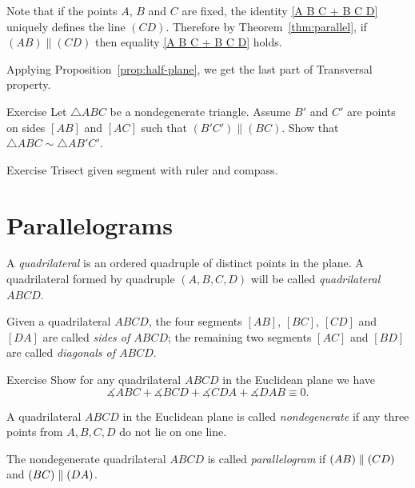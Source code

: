 Note that if the points $A$, $B$ and $C$ are fixed,
the identity \ref{A B C + B C D} uniquely defines the line $(C D)$.
Therefore by Theorem~\ref{thm:parallel}, if $(AB)\parallel(C D)$ then equality \ref{A B C + B C D} holds.

Applying Proposition~\ref{prop:half-plane},
we get the last part of Transversal property.
\qeds


\begin{thm}{Exercise}\label{ex:smililar+parallel}
Let $\triangle ABC$ be a nondegenerate triangle.
Assume $B'$ and $C'$ are points on sides $[AB]$ and $[AC]$ such that $(B'C')\parallel(BC)$.
Show that $\triangle ABC\sim\triangle AB'C'$.
\end{thm}

\begin{thm}{Exercise}\label{ex:trisection}
Trisect given segment with ruler and compass.
\end{thm}





\section*{Parallelograms}

A \emph{quadrilateral} is an ordered quadruple of distinct points in the plane.
A quadrilateral formed by quadruple $(A,B,C,D)$ will be called {}\emph{quadrilateral $ABCD$}.

Given a quadrilateral $ABCD$,
the four segments $[AB]$, $[BC]$, $[CD]$ and $[DA]$ are called \emph{sides of $ABCD$};
the remaining two segments $[AC]$ and $[BD]$ are called \emph{diagonals of $ABCD$}.


\begin{thm}{Exercise}\label{ex:quadrilateral}
Show for any quadrilateral $ABCD$  in the Euclidean plane we have
$$\measuredangle ABC+\measuredangle BCD+\measuredangle CDA+\measuredangle DAB\equiv 0.$$

\end{thm}

A quadrilateral $ABCD$ in the Euclidean plane is called \emph{nondegenerate} if any three points from $A,B,C,D$ do not lie on one line.

The nondegenerate quadrilateral $ABCD$ is called \emph{parallelogram}
if $(AB)\z\parallel (CD)$ and $(BC)\z\parallel (DA)$.

